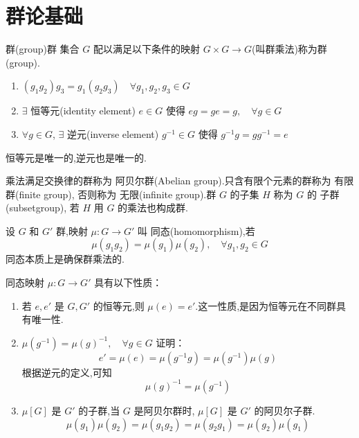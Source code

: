 \documentclass[../main.tex]{subfiles}
\begin{document}
\hypersetup{pageanchor=true}

 \chapter{群论基础}
 \begin{definition}{群(group)}{群}
     集合 $G$ 配以满足以下条件的映射 $G\times G \rightarrow G$(叫群乘法)称为群(group).
     \begin{enumerate}
         \item $(g_1g_2)g_3 = g_1(g_2g_3) \quad \forall g_1,g_2,g_3 \in G$
         \item $\exists$ 恒等元(identity element) $e \in G$ 使得 $eg = ge = g, \quad \forall g \in G$
         \item $\forall g \in  G$, $\exists$ 逆元(inverse element) $g^{-1} \in G$ 使得 $g^{-1}g = gg^{-1}=e $
     \end{enumerate}
 \end{definition}
 \begin{note}
     恒等元是唯一的,逆元也是唯一的.
 \end{note}
\begin{definition}{}{}
      乘法满足交换律的群称为 阿贝尔群(Abelian group).只含有限个元素的群称为 有限群(finite group), 否则称为 无限(infinite group).群 $G$ 的子集 $H$ 称为 $G$ 的 子群(subsetgroup), 若 $H$ 用 $G$ 的乘法也构成群.
 \end{definition}
 \begin{definition}{}{}
     设 $G$ 和 $G'$ 群,映射 $\mu :G\rightarrow G'$ 叫 同态(homomorphism),若
     $$
     \mu(g_1g_2) = \mu(g_1)\mu(g_2),\quad \forall g_1, g_2 \in G
     $$
     同态本质上是确保群乘法的.
 \end{definition}
 \begin{theorem}
    同态映射 $\mu :G\rightarrow G'$ 具有以下性质：
 \begin{enumerate}
     \item 若 $e,e'$ 是 $G,G'$ 的恒等元,则 $\mu(e) = e'$.这一性质,是因为恒等元在不同群具有唯一性.
     \item  $\mu(g^{-1}) = \mu(g)^{-1},\quad \forall g \in G$
             证明：
             $$
             e' = \mu(e) = \mu({g^{-1}}g) = \mu(g^{-1}) \mu(g)
             $$
             根据逆元的定义,可知
             $$
             \mu(g)^{-1} = \mu(g^{-1})
             $$
     \item $\mu[G]$ 是 $G'$ 的子群,当 $G$ 是阿贝尔群时, $\mu[G]$ 是 $G'$ 的阿贝尔子群.
             $$
             \mu(g_1)\mu(g_2) = \mu(g_1g_2) = \mu(g_2g_1) = \mu(g_2)\mu(g_1)
             $$
 \end{enumerate}
 \end{theorem}
\end{document}
